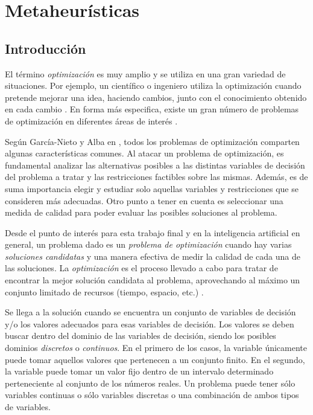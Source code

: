 \chapter{Metaheurísticas}

\section{Introducción}
El término \textit{optimización} es muy amplio y se utiliza en una gran variedad de situaciones. Por ejemplo, un científico o ingeniero utiliza la optimización cuando pretende mejorar una idea, haciendo cambios, junto con el conocimiento obtenido en cada cambio  \cite{haupt}. En forma más especifica, existe un gran número de problemas de optimización en diferentes áreas de interés \cite{Mitchell,Goldberg}.


Según García-Nieto y Alba en \cite{GarciaNietoAlba}, todos los problemas de optimización comparten algunas características comunes. Al atacar un problema de optimización, es fundamental analizar las alternativas posibles a las distintas variables de decisión del problema a tratar y las restricciones factibles sobre las mismas. Además, es de suma importancia elegir y estudiar solo aquellas variables y restricciones que se consideren más adecuadas. Otro punto a tener en cuenta es seleccionar una medida de calidad para poder evaluar las posibles soluciones al problema.


Desde el punto de interés para esta trabajo final y en la inteligencia artificial en general, un problema dado es un \textit{problema de optimización} cuando hay varias \textit{soluciones candidatas} y una manera efectiva de medir la calidad de cada una de las soluciones. La \textit{optimización} es el proceso llevado a cabo para tratar de encontrar la mejor solución candidata al problema, aprovechando al máximo un conjunto limitado de recursos (tiempo, espacio, etc.) \cite{DorigoCaro}.


Se llega a la solución cuando se encuentra un conjunto de variables de decisión y/o los valores adecuados para esas variables de decisión. Los valores se deben buscar dentro del dominio de las variables de decisión, siendo los posibles dominios \textit{discretos} o \textit{continuos}. En el primero de los casos, la variable únicamente puede tomar aquellos valores que pertenecen a un conjunto finito. En el segundo, la variable puede tomar un valor fijo dentro de un intervalo determinado perteneciente al conjunto de los números reales. Un problema puede tener sólo variables continuas o sólo variables discretas o una combinación de ambos tipos de variables.


